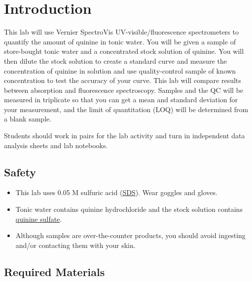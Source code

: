 \documentclass[]{tufte-book}
\providecommand{\tightlist}{%
  \setlength{\itemsep}{0pt}\setlength{\parskip}{0pt}}
\begin{document}
\hypertarget{uv-vis-intro}{%
\section*{Introduction}\label{uv-vis-intro}}

This lab will use Vernier SpectroVis UV-visible/fluorescence spectrometers to quantify the amount of quinine in tonic water. You will be given a sample of store-bought tonic water and a concentrated stock solution of quinine. You will then dilute the stock solution to create a standard curve and measure the concentration of quinine in solution and use quality-control sample of known concentration to test the accuracy of your curve. This lab will compare results between absorption and fluorescence spectroscopy. Samples and the QC will be measured in triplicate so that you can get a mean and standard deviation for your measurement, and the limit of quantitation (LOQ) will be determined from a blank sample.

Students should work in pairs for the lab activity and turn in independent data analysis sheets and lab notebooks.

\hypertarget{safety}{%
\subsection*{Safety}\label{safety}}

\begin{itemize}
\tightlist
\item
  This lab uses 0.05 M sulfuric acid (\href{https://beta-static.fishersci.com/content/dam/fishersci/en_US/documents/programs/education/regulatory-documents/sds/chemicals/chemicals-s/S25895.pdf}{SDS}). Wear goggles and gloves.
\item
  Tonic water contains quinine hydrochloride and the stock solution contains \href{https://beta-static.fishersci.com/content/dam/fishersci/en_US/documents/programs/education/regulatory-documents/sds/chemicals/chemicals-q/S25510A.pdf}{quinine sulfate}.
\item
  Although samples are over-the-counter products, you should avoid ingesting and/or contacting them with your skin.
\end{itemize}

\hypertarget{required-materials}{%
\subsection*{Required Materials}\label{required-materials}}
\end{document}
